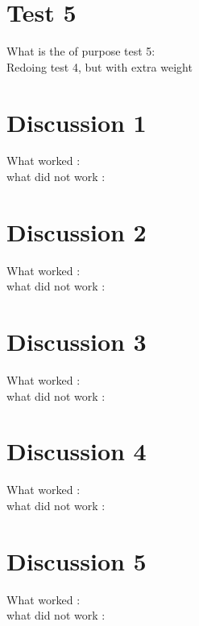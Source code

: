 \section{Test 5}

What is the of purpose test 5:\\
Redoing test 4, but with extra weight

\section{Discussion 1}
What worked : \\
what did not work : \\ 

\section{Discussion 2}
What worked : \\
what did not work : \\ 

\section{Discussion 3}
What worked : \\
what did not work : \\

\section{Discussion 4}
What worked : \\
what did not work : \\

\section{Discussion 5}
What worked : \\
what did not work : \\